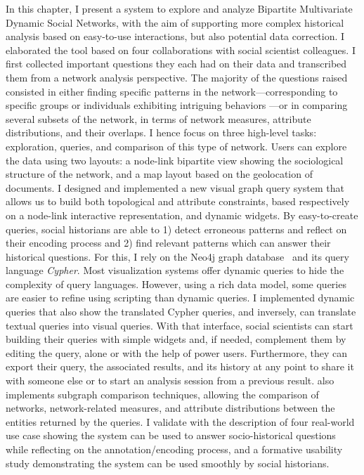 In this chapter, I present a \va system to explore and analyze Bipartite Multivariate Dynamic Social Networks, with the aim of supporting more complex historical analysis based on easy-to-use interactions, but also potential data correction.
I elaborated the tool based on four collaborations with social scientist colleagues.
I first collected important questions they each had on their data and transcribed them from a network analysis perspective.
The majority of the questions raised consisted in either finding specific patterns in the network---corresponding to specific groups or individuals exhibiting intriguing behaviors ---or in comparing several subsets of the network, in terms of network measures, attribute distributions, and their overlaps.
I hence focus on three high-level tasks: exploration, queries, and comparison of this type of network.
Users can explore the data using two layouts: a node-link bipartite view showing the sociological structure of the network, and a map layout based on the geolocation of documents.
I designed and implemented a new visual graph query system that allows us to build both topological and attribute constraints, based respectively on a node-link interactive representation, and dynamic widgets.
By easy-to-create queries, social historians are able to 1) detect erroneous patterns and reflect on their encoding process and 2) find relevant patterns which can answer their historical questions.
For this, I rely on the Neo4j graph database~\cite{neo4j} and its query language \emph{Cypher}.
Most visualization systems offer dynamic queries to hide the complexity of query languages.
However, using a rich data model, some queries are easier to refine using scripting than dynamic queries.
I implemented dynamic queries that also show the translated Cypher queries, and inversely, can translate textual queries into visual queries.
With that interface, social scientists can start building their queries with simple widgets and, if needed, complement them by editing the query, alone or with the help of power users.
Furthermore, they can export their query, the associated results, and its history at any point to share it with someone else or to start an analysis session from a previous result.
\name also implements subgraph comparison techniques, allowing the comparison of networks, network-related measures, and attribute distributions between the entities returned by the queries.
I validate \combinet with the description of four real-world use case showing the system can be used to answer socio-historical questions while reflecting on the annotation/encoding process, and a formative usability study demonstrating the system can be used smoothly by social historians.

